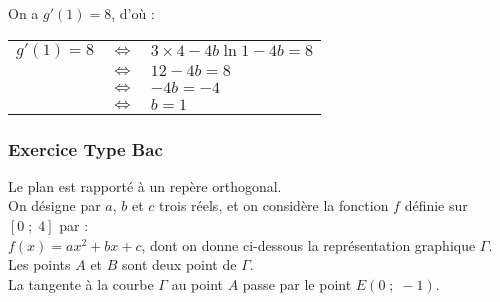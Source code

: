 \vspace*{.3cm}

On a $g'(1) = 8$, d'où : \\

\begin{tabular}{lll}
$g'(1) = 8$ & $\Longleftrightarrow$ & $3 \times 4 - 4b \ln 1 - 4b = 8$ \\
& $\Longleftrightarrow$ & $12 - 4b = 8$ \\
& $\Longleftrightarrow$ & $-4b = -4$ \\
& $\Longleftrightarrow$ & $b = 1$ 
\end{tabular}

\vspace*{-5cm}

\newpage

\subsubsection{Exercice Type Bac }

Le plan est rapporté à un repère orthogonal. \\

On désigne par $a$, $b$ et $c$ trois réels, et on considère la fonction $f$ définie sur $\left[0 \; ; \; 4\right]$ par : \\ $f(x) = ax^2 + bx + c$, dont on donne ci-dessous la représentation graphique $\Gamma$. \\

Les points $A$ et $B$ sont deux point de $\Gamma$. \\

La tangente à la courbe $\Gamma$ au point $A$ passe par le point $E\left(0 \; ; \; -1\right)$. \\

